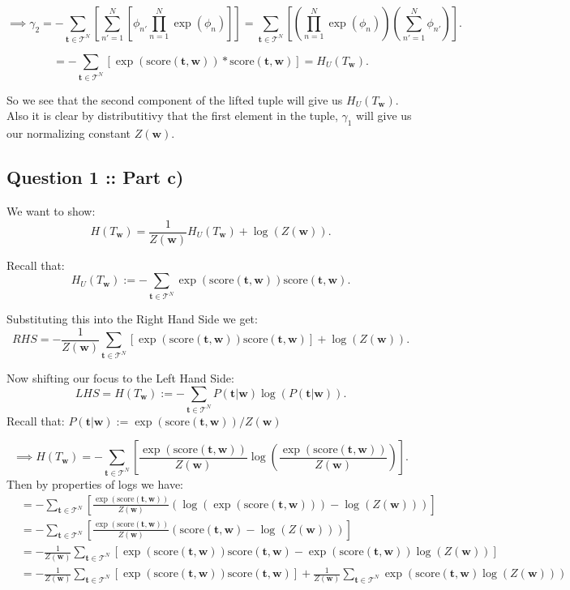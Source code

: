 \documentclass[a4paper]{article}
\begin{document}
\[
    \implies \gamma_2 = -\sum_{\bm{t} \in \mathcal{T}^N} \left[ \sum_{n'=1}^{N} \left[ \phi_{n'} \prod_{n=1}^{N} \exp(\phi_n)  \right]   \right] =
    \sum_{\bm{t} \in \mathcal{T}^N} \left[ \left( \prod_{n=1}^{N} \exp(\phi_n)  \right) \left( \sum_{n' = 1}^{N} \phi_{n'} \right)  \right] 
.\]

\[
    = -\sum_{\bm{t} \in \mathcal{T}^N} \left[ \exp(\text{score}(\bm{t}, \bm{w})) * \text{score}(\bm{t}, \bm{w}) \right] = H_U(T_{\bm{w}})
.\]

So we see that the second component of the lifted tuple will give us $H_U(T_{\bm{w}})$.
Also it is clear by distributitivy that the first element in the tuple, $\gamma_1$ will give us our normalizing constant $Z(\bm{w})$.

\subsection*{Question 1 :: Part c)}
We want to show:
\[
H(T_{\bm{w}}) = \frac{1}{Z(\bm{w})} H_U(T_{\bm{w}}) + \log(Z(\bm{w}))
.\]

Recall that:
\[
H_U(T_{\bm{w}}) := - \sum_{\bm{t} \in \mathcal{T}^N} \exp(\text{score}(\bm{t}, \bm{w})) \text{score}(\bm{t}, \bm{w})
.\]

Substituting this into the Right Hand Side we get:
\[
    RHS = -\frac{1}{Z(\bm{w})} \sum_{\bm{t} \in \mathcal{T}^N} \left[ \exp(\text{score}(\bm{t}, \bm{w})) \text{score}(\bm{t}, \bm{w}) \right] + \log(Z(\bm{w}))
.\]

Now shifting our focus to the Left Hand Side:
\[
    LHS = H(T_{\bm{w}}) := -\sum_{\bm{t} \in \mathcal{T}^N} P(\bm{t} | \bm{w}) \log(P(\bm{t} | \bm{w}))
.\]
Recall that: $P(\bm{t} | \bm{w}) := \exp(\text{score}(\bm{t}, \bm{w})) / Z(\bm{w})$

\[
    \implies H(T_{\bm{w}}) = -\sum_{\bm{t} \in \mathcal{T}^N} \left[ \frac{\exp(\text{score}(\bm{t}, \bm{w}))}{Z(\bm{w})} \log\left(\frac{\exp(\text{score}(\bm{t}, \bm{w}))}{Z(\bm{w})}\right) \right] 
.\]
Then by properties of logs we have:
\begin{align*}
         &=  - \sum_{\bm{t} \in \mathcal{T}^N} \left[ \frac{\exp(\text{score}(\bm{t}, \bm{w}))}{Z(\bm{w})} \left( \log(\exp(\text{score}(\bm{t}, \bm{w}))) - \log(Z(\bm{w})) \right) \right] \\ 
    &=  - \sum_{\bm{t} \in \mathcal{T}^N} \left[ \frac{\exp(\text{score}(\bm{t}, \bm{w}))}{Z(\bm{w})} \left( \text{score}(\bm{t}, \bm{w}) - \log(Z(\bm{w})) \right) \right] \\ 
   &=  -\frac{1}{Z(\bm{w})} \sum_{\bm{t} \in \mathcal{T}^N} \left[ \exp(\text{score}(\bm{t}, \bm{w})) \text{score}(\bm{t}, \bm{w}) -\exp(\text{score}(\bm{t}, \bm{w})) \log(Z(\bm{w}))\right] \\ 
   &=  -\frac{1}{Z(\bm{w})} \sum_{\bm{t} \in \mathcal{T}^N} \left[ \exp(\text{score}(\bm{t}, \bm{w})) \text{score}(\bm{t}, \bm{w}) \right]
   + \frac{1}{Z(\bm{w})} \sum_{\bm{t} \in \mathcal{T}^N} \exp(\text{score}(\bm{t}, \bm{w}) \log(Z(\bm{w})))
\end{align*}
\end{document}
